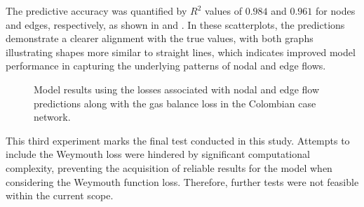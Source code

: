 The predictive accuracy was quantified by \( R^2 \) values of \( 0.984 \) and \( 0.961 \) for nodes and edges, respectively, as shown in  and . In these scatterplots, the predictions demonstrate a clearer alignment with the true values, with both graphs illustrating shapes more similar to straight lines, which indicates improved model performance in capturing the underlying patterns of nodal and edge flows.


\begin{figure}[htbp]
    \centering
    \setlength{}        
    \setlength{} 
    
    \caption{Model results using the losses associated with nodal and edge flow predictions along with the gas balance loss in the Colombian case network.}
    \label{fig:col_base_f_bal_results_non_lineal}
\end{figure}



This third experiment marks the final test conducted in this study. Attempts to include the Weymouth loss were hindered by significant computational complexity, preventing the acquisition of reliable results for the model when considering the Weymouth function loss. Therefore, further tests were not feasible within the current scope.



